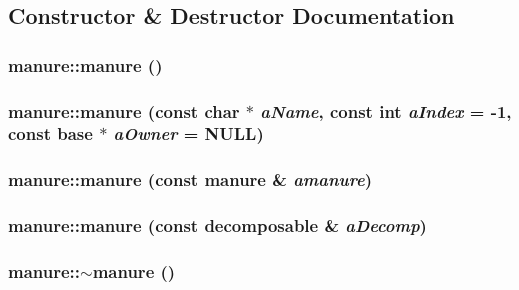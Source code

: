 \subsection{Constructor \& Destructor Documentation}
\hypertarget{classmanure_a169ecc5b27034bb777db79053f571c6e}{
\subsubsection[{manure}]{\setlength{\rightskip}{0pt plus 5cm}manure::manure ()}}
\label{classmanure_a169ecc5b27034bb777db79053f571c6e}
\hypertarget{classmanure_a38f96dbe471887e6846f2435209bce64}{
\subsubsection[{manure}]{\setlength{\rightskip}{0pt plus 5cm}manure::manure (const char $\ast$ {\em aName}, \/  const int {\em aIndex} = {\ttfamily -\/1}, \/  const {\bf base} $\ast$ {\em aOwner} = {\ttfamily NULL})}}
\label{classmanure_a38f96dbe471887e6846f2435209bce64}
\hypertarget{classmanure_afbb8c5beb0e7ac02c565f8d754a05558}{
\subsubsection[{manure}]{\setlength{\rightskip}{0pt plus 5cm}manure::manure (const {\bf manure} \& {\em amanure})}}
\label{classmanure_afbb8c5beb0e7ac02c565f8d754a05558}
\hypertarget{classmanure_a46c220944c99cbd781019f206233bf32}{
\subsubsection[{manure}]{\setlength{\rightskip}{0pt plus 5cm}manure::manure (const {\bf decomposable} \& {\em aDecomp})}}
\label{classmanure_a46c220944c99cbd781019f206233bf32}
\hypertarget{classmanure_ac1beb68437856daf80d130aa4714cf66}{
\subsubsection[{$\sim$manure}]{\setlength{\rightskip}{0pt plus 5cm}manure::$\sim$manure ()}}
\label{classmanure_ac1beb68437856daf80d130aa4714cf66}


